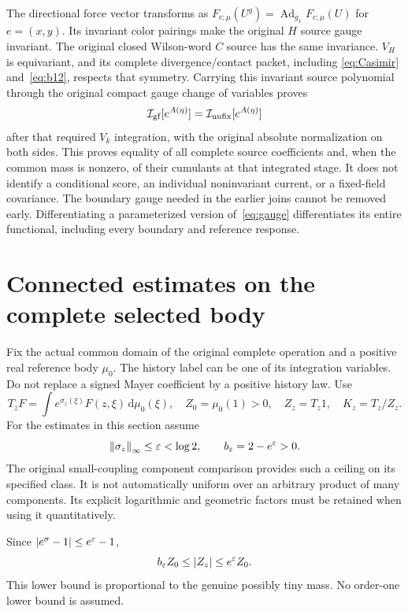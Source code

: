 \documentclass[11pt,letterpaper]{article}
\theoremstyle{plain}
\theoremstyle{remark}\newtheorem{remark}[theorem]{Scope}
\DeclareMathOperator{\Ad}{Ad}
\newcommand{\dd}{\,\mathrm d}\newcommand{\OH}{\mathcal O_H}
\newcommand{\norm}[1]{\left\lVert#1\right\rVert}
\providecommand{\mathscr}{\mathcal}
\begin{document}
The directional force vector transforms as
$F_{e;\mu}(U^g)=\Ad_{g_x}F_{e;\mu}(U)$ for $e=(x,y)$.
Its invariant color pairings make the original $H$ source gauge invariant.
The original closed Wilson-word $C$ source has the same invariance. $V_H$ is
equivariant, and its complete divergence/contact packet, including
\eqref{eq:Casimir} and~\eqref{eq:b12}, respects that symmetry.
Carrying this invariant source polynomial through the original compact gauge
change of variables proves
\begin{equation}
\mathscr I_{\rm gf}[e^{A(\eta)}]
=\mathscr I_{\rm unfix}[e^{A(\eta)}]
\label{eq:gauge}
\end{equation}
after that required $V_k$ integration, with the original absolute
normalization on both sides. This proves equality of all complete source
coefficients and, when the common mass is nonzero, of their cumulants at
that integrated stage. It does not identify a conditional score, an individual
noninvariant current, or a fixed-field covariance. The boundary gauge needed
in the earlier joins cannot be removed early. Differentiating a parameterized
version of~\eqref{eq:gauge} differentiates its entire functional, including
every boundary and reference response.

\section{Connected estimates on the complete selected body}
\label{sec:connected}

Fix the actual common domain of the original complete operation and a positive
real reference body $\mu_0$. The history label can be one of its integration
variables. Do not replace a signed Mayer coefficient by a positive history law.
Use
\begin{equation}
T_zF=\int e^{\sigma_z(\xi)}F(z,\xi)\dd\mu_0(\xi),\quad
Z_0=\mu_0(1)>0,\quad Z_z=T_z1,\quad K_z=T_z/Z_z.
\label{eq:body}
\end{equation}
For the estimates in this section assume
\begin{equation}
\norm{\sigma_z}_\infty\le\eps<\log2,
\qquad b_\eps=2-e^\eps>0.
\label{eq:epsilon}
\end{equation}
The original small-coupling component comparison provides such a ceiling on
its specified class. It is not automatically uniform over an arbitrary
product of many components. Its explicit logarithmic and geometric factors
must be retained when using it quantitatively.

Since $|e^\sigma-1|\le e^\varepsilon-1$,
\begin{equation}
b_\varepsilon Z_0\le |Z_z|\le e^\varepsilon Z_0.
\label{eq:nonzero}
\end{equation}
This lower bound is proportional to the genuine possibly tiny mass. No
order-one lower bound is assumed.
\end{document}
